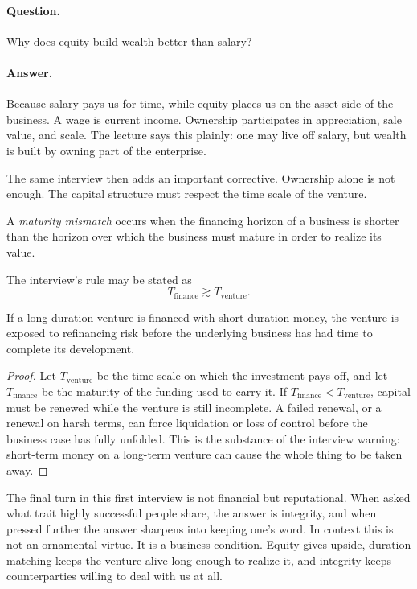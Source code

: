 \paragraph{Question.} Why does equity build wealth better than salary?

\paragraph{Answer.} Because salary pays us for time, while equity places us on the asset side of the business. A wage is current income. Ownership participates in appreciation, sale value, and scale. The lecture says this plainly: one may live off salary, but wealth is built by owning part of the enterprise.

The same interview then adds an important corrective. Ownership alone is not enough. The capital structure must respect the time scale of the venture.

\begin{definition}
A \emph{maturity mismatch} occurs when the financing horizon of a business is shorter than the horizon over which the business must mature in order to realize its value.
\end{definition}

The interview's rule may be stated as
\begin{equation}
T_{\mathrm{finance}} \gtrsim T_{\mathrm{venture}}.
\end{equation}

\begin{proposition}
If a long-duration venture is financed with short-duration money, the venture is exposed to refinancing risk before the underlying business has had time to complete its development.
\end{proposition}

\begin{proof}
Let $T_{\mathrm{venture}}$ be the time scale on which the investment pays off, and let $T_{\mathrm{finance}}$ be the maturity of the funding used to carry it. If $T_{\mathrm{finance}} < T_{\mathrm{venture}}$, capital must be renewed while the venture is still incomplete. A failed renewal, or a renewal on harsh terms, can force liquidation or loss of control before the business case has fully unfolded. This is the substance of the interview warning: short-term money on a long-term venture can cause the whole thing to be taken away.
\end{proof}

The final turn in this first interview is not financial but reputational. When asked what trait highly successful people share, the answer is integrity, and when pressed further the answer sharpens into keeping one's word. In context this is not an ornamental virtue. It is a business condition. Equity gives upside, duration matching keeps the venture alive long enough to realize it, and integrity keeps counterparties willing to deal with us at all.

